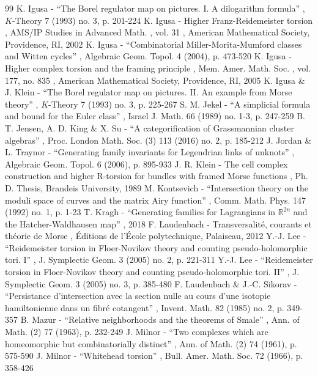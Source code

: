 \documentclass[11pt]{article}
\numberwithin{equation}{section}\providecommand{\dpl}{\displaystyle}
\theoremstyle{plain}
\theoremstyle{definition}
\begin{document}
\begin{thebibliography}{99}
 K. Igusa - “The Borel regulator map on pictures. I. A dilogarithm formula” , $K$-Theory 7 (1993) no. 3, p. 201-224
 K. Igusa - Higher Franz-Reidemeister torsion , AMS/IP Studies in Advanced Math. , vol. 31 , American Mathematical Society, Providence, RI, 2002
 K. Igusa - “Combinatorial Miller-Morita-Mumford classes and Witten cycles” , Algebraic Geom. Topol. 4 (2004), p. 473-520
 K. Igusa - Higher complex torsion and the framing principle , Mem. Amer. Math. Soc. , vol. 177, no. 835 , American Mathematical Society, Providence, RI, 2005
 K. Igusa \& J. Klein - “The Borel regulator map on pictures. II. An example from Morse theory” , $K$-Theory 7 (1993) no. 3, p. 225-267
 S. M. Jekel - “A simplicial formula and bound for the Euler class” , Israel J. Math. 66 (1989) no. 1-3, p. 247-259
 B. T. Jensen, A. D. King \& X. Su - “A categorification of Grassmannian cluster algebras” , Proc. London Math. Soc. (3) 113 (2016) no. 2, p. 185-212
 J. Jordan \& L. Traynor - “Generating family invariants for Legendrian links of unknots” , Algebraic Geom. Topol. 6 (2006), p. 895-933
 J. R. Klein - The cell complex construction and higher R-torsion for bundles with framed Morse functions , Ph. D. Thesis, Brandeis University, 1989
 M. Kontsevich - “Intersection theory on the moduli space of curves and the matrix Airy function” , Comm. Math. Phys. 147 (1992) no. 1, p. 1-23
 T. Kragh - “Generating families for Lagrangians in $\mathbb{R}^{2n}$ and the Hatcher-Waldhausen map” , 2018
 F. Laudenbach - Transversalité, courants et théorie de Morse , Éditions de l’École polytechnique, Palaiseau, 2012
 Y.-J. Lee - “Reidemeister torsion in Floer-Novikov theory and counting pseudo-holomorphic tori. I” , J. Symplectic Geom. 3 (2005) no. 2, p. 221-311
 Y.-J. Lee - “Reidemeister torsion in Floer-Novikov theory and counting pseudo-holomorphic tori. II” , J. Symplectic Geom. 3 (2005) no. 3, p. 385-480
 F. Laudenbach \& J.-C. Sikorav - “Persistance d’intersection avec la section nulle au cours d’une isotopie hamiltonienne dans un fibré cotangent” , Invent. Math. 82 (1985) no. 2, p. 349-357
 B. Mazur - “Relative neighborhoods and the theorems of Smale” , Ann. of Math. (2) 77 (1963), p. 232-249
 J. Milnor - “Two complexes which are homeomorphic but combinatorially distinct” , Ann. of Math. (2) 74 (1961), p. 575-590
 J. Milnor - “Whitehead torsion” , Bull. Amer. Math. Soc. 72 (1966), p. 358-426

\end{thebibliography}
\end{document}

